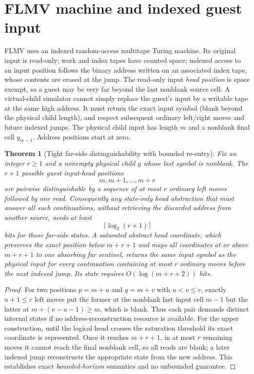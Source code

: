 \documentclass[10pt]{article}
\newtheorem{theorem}{Theorem}
\begin{document}
\section{FLMV machine and indexed guest input}
FLMV uses an indexed random-access multitape Turing machine. Its original input is read-only; work and index tapes have counted space; indexed access to an input position follows the binary address written on an associated index tape, whose contents are erased at the jump. The read-only input \emph{head position} is space exempt, so a guest may be very far beyond the last nonblank source cell. A virtual-child simulator cannot simply replace the guest's input by a writable tape at the same high address. It must return the exact input symbol (blank beyond the physical child length), and respect subsequent ordinary left/right moves and future indexed jumps. The physical child input has length $m$ and a nonblank final cell $y_{m-1}$. Address positions start at zero.
\begin{theorem}[Tight far-side distinguishability with bounded re-entry]
Fix an integer $r\ge1$ and a nonempty physical child $y$ whose last symbol is nonblank. The $r+1$ possible guest input-head positions
\[m,m+1,\ldots,m+r\]
are pairwise distinguishable by a sequence of at most $r$ ordinary \emph{left} moves followed by one read. Consequently any \emph{state-only} head abstraction that must answer all such continuations, without retrieving the discarded address from another source, needs at least
\[\boxed{\lceil\log_2(r+1)\rceil}\]
bits for those far-side states. A saturated abstract head coordinate, which preserves the exact position below $m+r+1$ and maps all coordinates at or above $m+r+1$ to one absorbing far sentinel, returns the same input symbol as the physical input for every continuation containing at most $r$ ordinary moves before the next indexed jump. Its state requires $O(\log(m+r+2))$ bits.
\end{theorem}
\begin{proof}
For two positions $p=m+u$ and $q=m+v$ with $u<v\le r$, exactly $u+1\le r$ left moves put the former at the nonblank last input cell $m-1$ but the latter at $m+(v-u-1)\ge m$, which is blank. Thus each pair demands distinct internal states if no address-reconstruction resource is available. For the upper construction, until the logical head crosses the saturation threshold its exact coordinate is represented. Once it reaches $m+r+1$, in at most $r$ remaining moves it cannot reach the final nonblank cell, so all reads are blank; a later indexed jump reconstructs the appropriate state from the new address. This establishes exact \emph{bounded-horizon} semantics and no unbounded guarantee. \end{proof}
\end{document}
